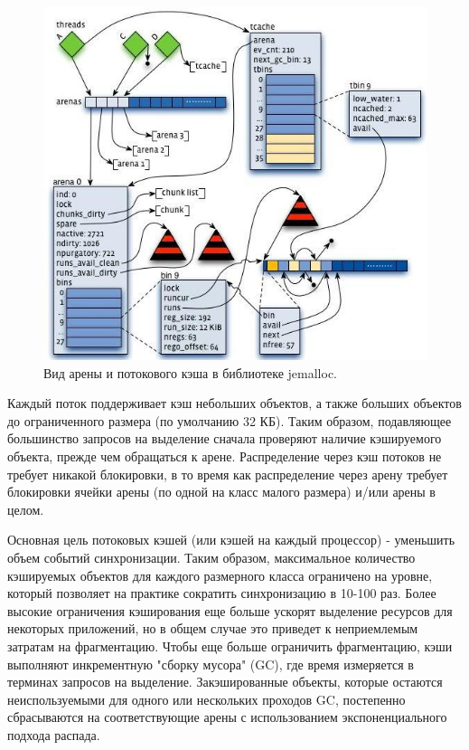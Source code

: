 \begin{figure}[!h]
	\begin{center}
		\includegraphics[scale=0.6]{images/jemalloc-arena-and-thread-cache-layout.jpg}
		\caption{Вид арены и потокового кэша в библиотеке jemalloc.}
		\label{jemalloc-arena-and-thread-cache-layout}
	\end{center}
\end{figure}

Каждый поток поддерживает кэш небольших объектов, а также больших объектов до ограниченного размера (по умолчанию 32 КБ). Таким образом, подавляющее большинство запросов на выделение сначала проверяют наличие кэшируемого объекта, прежде чем обращаться к арене. Распределение через кэш потоков не требует никакой блокировки, в то время как распределение через арену требует блокировки ячейки арены (по одной на класс малого размера) и/или арены в целом.

Основная цель потоковых кэшей (или кэшей на каждый процессор) - уменьшить объем событий синхронизации. Таким образом, максимальное количество кэшируемых объектов для каждого размерного класса ограничено на уровне, который позволяет на практике сократить синхронизацию в 10-100 раз. Более высокие ограничения кэширования еще больше ускорят выделение ресурсов для некоторых приложений, но в общем случае это приведет к неприемлемым затратам на фрагментацию. Чтобы еще больше ограничить фрагментацию, кэши выполняют инкрементную "сборку мусора" (GC), где время измеряется в терминах запросов на выделение. Закэшированные объекты, которые остаются неиспользуемыми для одного или нескольких проходов GC, постепенно сбрасываются на соответствующие арены с использованием экспоненциального подхода распада.

